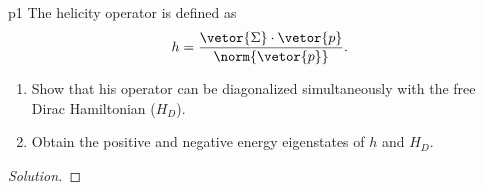 \begin{problem}{}{p1}
   The helicity operator is defined as
   \begin{equation*}
      h = \frac{\vetor{\Sigma}\cdot \vetor{p}}{\norm{\vetor{p}}}.
   \end{equation*}
   \begin{enumerate}[label=(\alph*)]
       \item Show that his operator can be diagonalized simultaneously with the free Dirac Hamiltonian (\(H_D\)).
       \item Obtain the positive and negative energy eigenstates of \(h\) and \(H_D\).
   \end{enumerate}
\end{problem}
\begin{proof}[Solution]
    
\end{proof}
